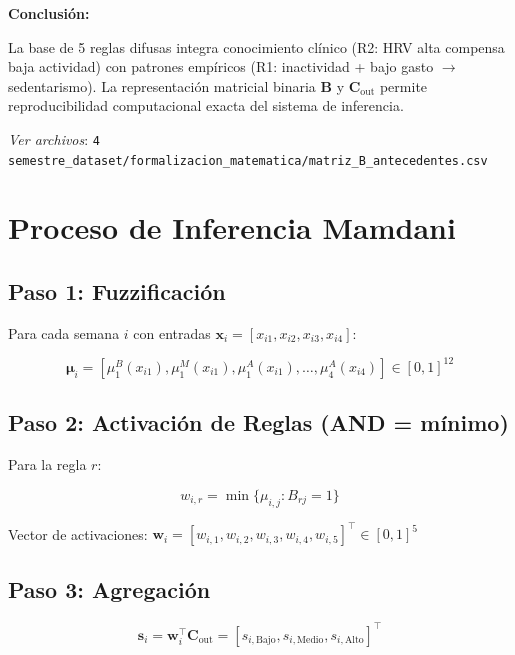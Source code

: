 \documentclass[12pt,letterpaper,twoside]{report}
\newcommand{\vect}[1]{\boldsymbol{#1}}
\newcommand{\mat}[1]{\mathbf{#1}}
\begin{document}
\begin{calculobox}
\begin{conclusionbox}
\textbf{Conclusión:}

La base de 5 reglas difusas integra conocimiento clínico (R2: HRV alta compensa baja actividad) con patrones empíricos (R1: inactividad + bajo gasto $\to$ sedentarismo). La representación matricial binaria $\mat{B}$ y $\mat{C}_{\text{out}}$ permite reproducibilidad computacional exacta del sistema de inferencia.
\end{conclusionbox}

\textit{Ver archivos}: \texttt{4 semestre\_dataset/formalizacion\_matematica/matriz\_B\_antecedentes.csv}

\section{Proceso de Inferencia Mamdani}

\subsection{Paso 1: Fuzzificación}

Para cada semana $i$ con entradas $\vect{x}_i = [x_{i1}, x_{i2}, x_{i3}, x_{i4}]$:

\begin{equation}
\vect{\mu}_i = [\mu_1^B(x_{i1}), \mu_1^M(x_{i1}), \mu_1^A(x_{i1}), \ldots, \mu_4^A(x_{i4})] \in [0,1]^{12}
\end{equation}

\subsection{Paso 2: Activación de Reglas (AND = mínimo)}

Para la regla $r$:

\begin{equation}
w_{i,r} = \min\{\mu_{i,j} : B_{rj} = 1\}
\end{equation}

Vector de activaciones: $\vect{w}_i = [w_{i,1}, w_{i,2}, w_{i,3}, w_{i,4}, w_{i,5}]^\top \in [0,1]^5$

\subsection{Paso 3: Agregación}

\begin{equation}
\vect{s}_i = \vect{w}_i^\top \mat{C}_{\text{out}} = [s_{i,\text{Bajo}}, s_{i,\text{Medio}}, s_{i,\text{Alto}}]^\top
\end{equation}


\end{calculobox}
\end{document}

